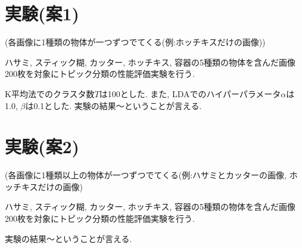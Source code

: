 \section{実験(案1)}
(各画像に1種類の物体が一つずつでてくる(例:ホッチキスだけの画像))
\par
ハサミ, スティック糊, カッター, ホッチキス, 容器の5種類の物体を含んだ画像200枚を対象にトピック分類の性能評価実験を行う.
\par
K平均法でのクラスタ数$T$は100とした. また, LDAでのハイパーパラメータ$\alpha$は1.0, $\beta$は0.1とした.
実験の結果～ということが言える.


\section{実験(案2)}
(各画像に1種類以上の物体が一つずつでてくる(例:ハサミとカッターの画像, ホッチキスだけの画像)
\par
ハサミ, スティック糊, カッター, ホッチキス, 容器の5種類の物体を含んだ画像200枚を対象にトピック分類の性能評価実験を行う.
\par
実験の結果～ということが言える.


